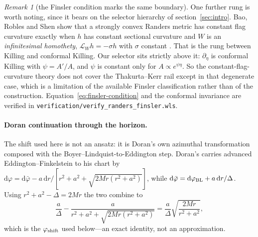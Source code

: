 \documentclass[12pt]{iopart}
\theoremstyle{plain}
\theoremstyle{definition}
\theoremstyle{remark}
\newtheorem{remark}[proposition]{Remark}
\newcommand{\dd}{\mathrm{d}}
\begin{document}
\begin{remark}[the Finsler condition marks the same boundary]
One further rung is worth noting, since it bears on the selector hierarchy of
section~\ref{sec:intro}. Bao, Robles and Shen show that a strongly convex Randers
metric has constant flag curvature exactly when $h$ has constant sectional
curvature and $W$ is an \emph{infinitesimal homothety}, $\mathcal L_Wh=-\sigma h$
with $\sigma$ constant \cite[Thm.~3.1]{BaoRoblesShen}. That is the rung between
Killing and conformal Killing. Our selector sits strictly above it: $\partial_\eta$
is conformal Killing with $\psi=A'/A$, and $\psi$ is constant only for
$A\propto e^{\psi\eta}$. So the constant-flag-curvature theory does not cover the
Thakurta--Kerr rail except in that degenerate case, which is a limitation of the
available Finsler classification rather than of the construction.
Equation~\eqref{eq:finsler-condition} and the conformal invariance are verified in
\texttt{verification/verify\_randers\_finsler.wls}.
\end{remark}

\paragraph{Doran continuation through the horizon.} The shift used here is not an
ansatz: it is Doran's own azimuthal transformation composed with the
Boyer--Lindquist-to-Eddington step. Doran's \cite[Eq.~(21)]{Doran2000} carries
advanced Eddington--Finkelstein to his chart by
$\dd\varphi=\dd\bar\varphi-a\,\dd r/[r^2+a^2+\sqrt{2Mr(r^2+a^2)}]$, while
$\dd\bar\varphi=\dd\varphi_{\rm BL}+a\,\dd r/\Delta$. Using
$r^2+a^2-\Delta=2Mr$ the two combine to
\begin{equation}
    \frac{a}{\Delta}-\frac{a}{r^2+a^2+\sqrt{2Mr(r^2+a^2)}}
      =\frac{a}{\Delta}\sqrt{\frac{2Mr}{r^2+a^2}} ,
    \label{eq:doran-shift}
\end{equation}
which is the $\varphi_{\rm shift}$ used below---an exact identity, not an
approximation.
\end{document}
